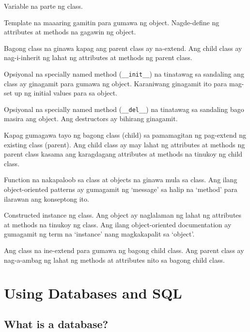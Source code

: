 \documentclass[10pt,]{book}
\providecommand{\tightlist}{%
  \setlength{\itemsep}{0pt}\setlength{\parskip}{0pt}}
\begin{document}
\begin{description}
\tightlist
\item[attribute]
Variable na parte ng class. 
\item[class]
Template na maaaring gamitin para gumawa ng object. Nagde-define ng
attributes at methods na gagawin ng object. 
\item[child class]
Bagong class na ginawa kapag ang parent class ay na-extend. Ang child
class ay nag-i-inherit ng lahat ng attributes at methods ng parent
class. 
\item[constructor]
Opsiyonal na specially named method (\texttt{\_\_init\_\_}) na tinatawag
sa sandaling ang class ay ginagamit para gumawa ng object. Karaniwang
ginagamit ito para mag-set up ng initial values para sa object.
\item[destructor]
Opsiyonal na specially named method (\texttt{\_\_del\_\_}) na tinatawag
sa sandaling bago masira ang object. Ang destructors ay bihirang
ginagamit. 
\item[inheritance]
Kapag gumagawa tayo ng bagong class (child) sa pamamagitan ng pag-extend
ng existing class (parent). Ang child class ay may lahat ng attributes
at methods ng parent class kasama ang karagdagang attributes at methods
na tinukoy ng child class. 
\item[method]
Function na nakapaloob sa class at objects na ginawa mula sa class. Ang
ilang object-oriented patterns ay gumagamit ng `message' sa halip na
`method' para ilarawan ang konseptong ito. 
\item[object]
Constructed instance ng class. Ang object ay naglalaman ng lahat ng
attributes at methods na tinukoy ng class. Ang ilang object-oriented
documentation ay gumagamit ng term na `instance' nang magkakapalit sa
`object'. 
\item[parent class]
Ang class na ine-extend para gumawa ng bagong child class. Ang parent
class ay nag-a-ambag ng lahat ng methods at attributes nito sa bagong
child class. 
\end{description}

\chapter{Using Databases and SQL}\label{using-databases-and-sql}

\section{What is a database?}\label{what-is-a-database}
\end{document}
